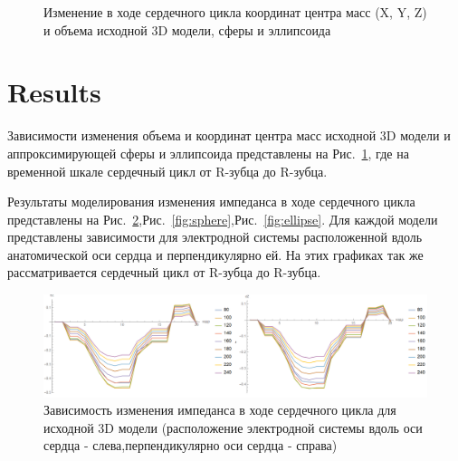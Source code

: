 \documentclass[conference]{IEEEtran}
\begin{document}
\begin{figure}[htbp]
    \caption{Изменение в ходе сердечного цикла координат центра масс (X, Y, Z) и объема исходной 3D модели, сферы и эллипсоида}
    \label{fig:rxyz}
\end{figure}

\section{Results}

Зависимости изменения объема и координат центра масс исходной 3D модели и аппроксимирующей сферы и эллипсоида представлены на Рис.~\ref{fig:rxyz},
где на временной шкале сердечный цикл от R-зубца до R-зубца.

Результаты моделирования изменения импеданса в ходе сердечного цикла представлены на Рис.~\ref{real},Рис.~\ref{fig:sphere},Рис.~\ref{fig:ellipse}.
Для каждой модели представлены зависимости для электродной системы расположенной вдоль анатомической оси сердца и перпендикулярно ей.
На этих графиках так же рассматривается сердечный цикл от R-зубца до R-зубца.

\begin{figure}[tbph]
    \centering
    \includegraphics[width=\linewidth]{fig/real}
    \caption{Зависимость изменения импеданса в ходе сердечного цикла для исходной 3D модели (расположение электродной системы вдоль оси сердца - слева,перпендикулярно оси сердца - справа)}
    \label{real}
\end{figure}
\end{document}
